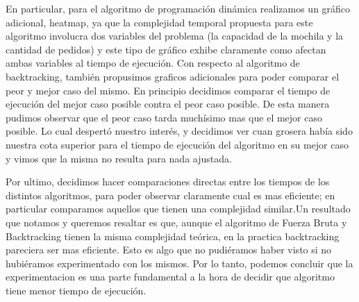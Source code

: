 En particular, para el algoritmo de programación dinámica realizamos un gráfico adicional, heatmap, ya que la complejidad temporal propuesta para este algoritmo involucra dos variables del problema (la capacidad de la mochila y la cantidad de pedidos) y este tipo de gráfico exhibe claramente como afectan ambas variables al tiempo de ejecución.
Con respecto al algoritmo de backtracking, también propusimos graficos adicionales para poder comparar el peor y mejor caso del mismo.
En principio decidimos comparar el tiempo de ejecución del mejor caso posible contra el peor caso posible. De esta manera pudimos observar que el peor caso tarda muchísimo mas que el mejor caso posible. Lo cual despertó nuestro interés, y decidimos ver cuan grosera había sido nuestra cota superior para el tiempo de ejecución del algoritmo en su mejor caso y vimos que la misma no resulta para nada ajustada.


Por ultimo, decidimos hacer comparaciones directas entre los tiempos de los distintos algoritmos, para poder observar claramente cual es mas eficiente; en particular comparamos aquellos que tienen una complejidad similar.Un resultado que notamos y queremos resaltar es que, aunque el algoritmo de Fuerza Bruta y Backtracking tienen la misma complejidad teórica, en la practica backtracking pareciera ser mas eficiente. Esto es algo que no pudiéramos haber visto si no hubiéramos experimentado con los mismos. Por lo tanto, podemos concluir que la experimentacion es una parte fundamental a la hora de decidir que algoritmo tiene menor tiempo de ejecución.